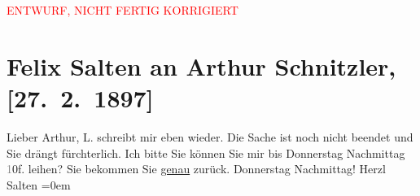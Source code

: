 
\begin{center}
            \textcolor{red}{ENTWURF, NICHT FERTIG KORRIGIERT}
                      \end{center}
            
         
         \renewcommand{\erwaehntePersonen}{Personen:  L.}
         \renewcommand{\erwaehnteOrte}{Orte: Wien}
         \renewcommand{\erwaehnteWerke}{}
               \section[Felix Salten an Arthur Schnitzler, {[}27. 2. 1897{]}]{ Felix Salten an Arthur Schnitzler, {[}27. 2. 1897{]}}\nopagebreak{}\rehead{ }\begin{ledgroupsized}[t]{13cm}\normalsize\beginnumbering \toendnotes[C]{\smallbreak\pagebreak[2]} 
\pstart
           \noindent{}{\pb}Lieber Arthur, { }L. schreibt mir eben wieder. Die Sache ist
               noch nicht beendet und Sie drängt fürchterlich. Ich bitte Sie können Sie mir bis
                  Donnerstag Nachmittag \textcolor{gray}{1}0f. {\pb}leihen? Sie bekommen Sie \uline{genau} zurück. Donnerstag Nachmittag! \pend
           \pstart
           Herzl {\\[\baselineskip]}\spacefill\mbox{Salten}\pend
           \leftskip=0em{}
         
         \endnumbering{}\end{ledgroupsized}\begin{anhang}\end{anhang}\newcommand{\dateiname}{L03260}\newcommand{\titel}{Felix Salten an Arthur Schnitzler, [27. 2. 1897]}\newcommand{\editorInnen}{Martin Anton Müller und Laura Untner}
      